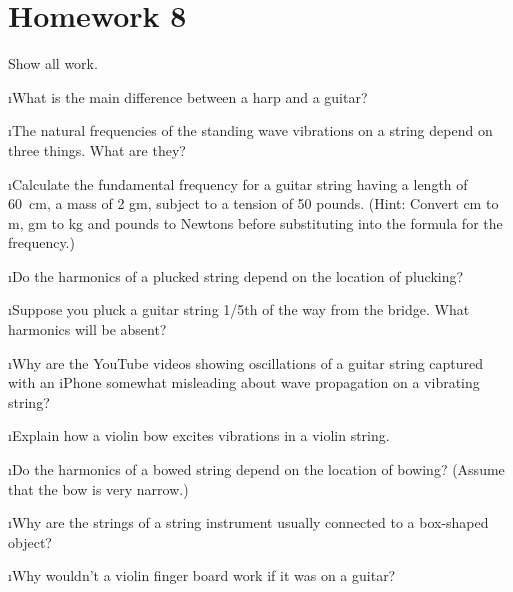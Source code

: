 \section{Homework 8}

\noindent
Show all work.

\ben

\i What is the main difference between a harp and a guitar?

\i The natural frequencies of the standing wave vibrations
on a string depend on three things.
What are they?

\i Calculate the fundamental frequency for a guitar string
having a length of 60~cm, a mass of 2 gm, subject to a 
tension of 50 pounds.
(Hint: Convert cm to m, gm to kg and pounds
to Newtons before substituting into the formula for the frequency.)

\i Do the harmonics of a plucked string depend on the 
location of plucking?

\i Suppose you pluck a guitar string 1/5th of the way from
the bridge.
What harmonics will be absent?

\i Why are the YouTube videos showing oscillations of a guitar
string captured with an iPhone somewhat misleading about wave 
propagation on a vibrating string?

\i Explain how a violin bow excites vibrations in a violin string.

\i Do the harmonics of a bowed string depend on the location 
of bowing?
(Assume that the bow is very narrow.)

\i Why are the strings of a string instrument usually connected 
to a box-shaped object?

\i Why wouldn't a violin finger board work if it was on a guitar?

\een


